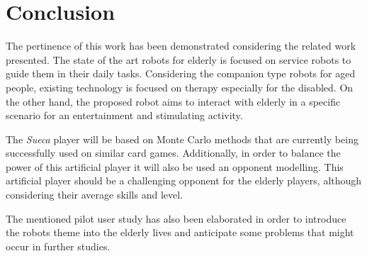 \section{Conclusion} \label{sec:conclusion}

The pertinence of this work has been demonstrated considering the related work presented.
The state of the art robots for elderly is focused on service robots to guide them in their daily tasks.
Considering the companion type robots for aged people, existing technology is focused on therapy especially for the disabled.
On the other hand, the proposed robot aims to interact with elderly in a specific scenario for an entertainment and stimulating activity.

The \emph{Sueca} player will be based on Monte Carlo methods that are currently being successfully used on similar card games.
Additionally, in order to balance the power of this artificial player it will also be used an opponent modelling.
This artificial player should be a challenging opponent for the elderly players, although considering their average skills and level.

The mentioned pilot user study has also been elaborated in order to introduce the robots theme into the elderly lives and anticipate some problems that might occur in further studies.

